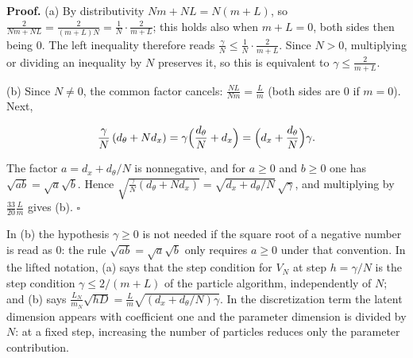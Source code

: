 \documentclass[11pt,a4paper]{article}
\begin{document}
\textbf{Proof.} (a) By distributivity \(Nm+NL=N(m+L)\), so \(\frac2{Nm+NL}=\frac2{(m+L)N}=\frac1N\cdot\frac2{m+L}\); this holds also when \(m+L=0\), both sides then being \(0\). The left inequality therefore reads \(\frac\gamma N\le\frac1N\cdot\frac2{m+L}\). Since \(N>0\), multiplying or dividing an inequality by \(N\) preserves it, so this is equivalent to \(\gamma\le\frac2{m+L}\).




(b) Since \(N\ne0\), the common factor cancels: \(\frac{NL}{Nm}=\frac Lm\) (both sides are \(0\) if \(m=0\)). Next,


\[\frac\gamma N\,(d_\theta+Nd_x)=\gamma\Bigl(\frac{d_\theta}N+d_x\Bigr)=\Bigl(d_x+\frac{d_\theta}N\Bigr)\gamma .\]


The factor \(a=d_x+d_\theta/N\) is nonnegative, and for \(a\ge0\) and \(b\ge0\) one has \(\sqrt{ab}=\sqrt a\sqrt b\). Hence \(\sqrt{\frac\gamma N(d_\theta+Nd_x)}=\sqrt{d_x+d_\theta/N}\,\sqrt\gamma\), and multiplying by \(\frac{33}{20}\frac Lm\) gives (b). \(\square\)




In (b) the hypothesis \(\gamma\ge0\) is not needed if the square root of a negative number is read as \(0\): the rule \(\sqrt{ab}=\sqrt a\sqrt b\) only requires \(a\ge0\) under that convention. In the lifted notation, (a) says that the step condition for \(V_N\) at step \(h=\gamma/N\) is the step condition \(\gamma\le2/(m+L)\) of the particle algorithm, independently of \(N\); and (b) says \(\frac{L_N}{m_N}\sqrt{hD}=\frac Lm\sqrt{(d_x+d_\theta/N)\gamma}\). In the discretization term the latent dimension appears with coefficient one and the parameter dimension is divided by \(N\): at a fixed step, increasing the number of particles reduces only the parameter contribution.
\end{document}
